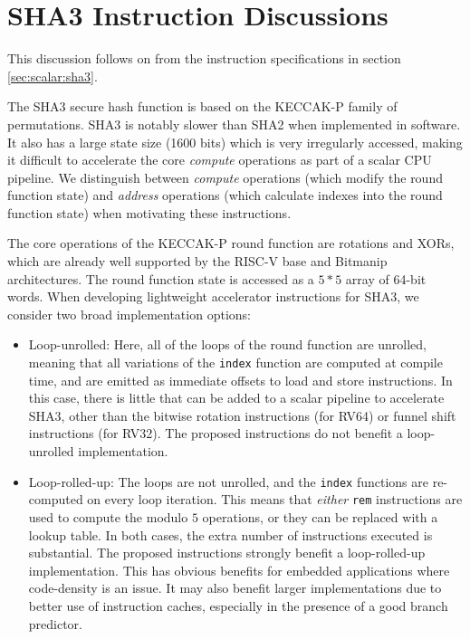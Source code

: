\newpage
\section{SHA3 Instruction Discussions}
\label{sec:appendix:sha3}

This discussion follows on from the instruction specifications
in section
\ref{sec:scalar:sha3}.

The SHA3 secure hash function \cite{nist:fips:202} is based on
the KECCAK-P family of permutations.
SHA3 is notably slower than SHA2 when implemented in software.
It also has a large state size (1600 bits) which is very irregularly
accessed, making it difficult to accelerate
the core {\em compute} operations as part of a scalar CPU pipeline.
We distinguish between {\em compute} operations (which modify the
round function state) and {\em address} operations (which calculate
indexes into the round function state) when motivating these instructions.

The core operations of the KECCAK-P round function are rotations
and XORs, which are already well supported by the RISC-V
base and Bitmanip architectures.
The round function state is accessed as a $5*5$ array of
64-bit words.
When developing lightweight accelerator instructions for SHA3, we
consider two broad implementation options:

\begin{itemize}
\item Loop-unrolled: Here, all of the loops of the round function are
    unrolled, meaning that all variations of the \lstinline{index}
    function are computed at compile time, and are emitted as immediate
    offsets to load and store instructions.
    In this case, there is little that can be added to a scalar
    pipeline to accelerate SHA3, other than the bitwise rotation instructions
    (for RV64) or funnel shift instructions (for RV32).
    The proposed instructions do not benefit a loop-unrolled implementation.
\item Loop-rolled-up: The loops are not unrolled, and the
    \lstinline{index} functions are re-computed on every loop iteration.
    This means that {\em either} {\tt rem} instructions are used to
    compute the modulo $5$ operations, or they can be replaced with a
    lookup table.
    In both cases, the extra number of instructions executed is
    substantial.
    The proposed instructions strongly benefit a loop-rolled-up
    implementation.
    This has obvious benefits for embedded applications where code-density
    is an issue.
    It may also benefit larger implementations due to better use of
    instruction caches, especially in the presence of a good branch
    predictor.
\end{itemize}

